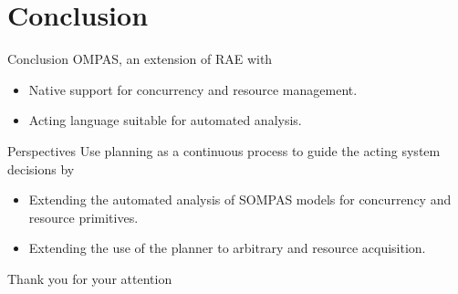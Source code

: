 \section{Conclusion}
\begin{frame}[c]{Conclusion}
    OMPAS, an extension of RAE with
    \begin{itemize}
        \item Native support for concurrency and resource management.
        \item Acting language suitable for automated analysis.
    \end{itemize}    
\end{frame}

\begin{frame}[c]{Perspectives}
    Use planning as a continuous process to guide the acting system decisions by
    \begin{itemize}
    \item Extending the automated analysis of SOMPAS models \cite{turiGuidanceRefinementbasedActing2022} for concurrency and resource primitives.
    \item Extending the use of the planner to arbitrary and resource acquisition.
    \end{itemize}
\end{frame}

\begin{frame}
    \LARGE
    \centering
    Thank you for your attention
\end{frame}

